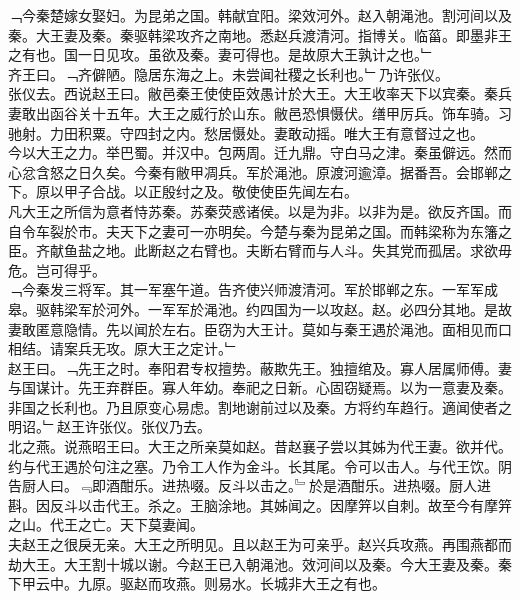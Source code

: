 \documentclass{zhvt-classic}
\begin{document}
\hspace*{2em}﹁今秦楚嫁女娶妇。为昆弟之国。韩献宜阳。梁效河外。赵入朝渑池。割河间以及秦。大王妻及秦。秦驱韩梁攻齐之南地。悉赵兵渡清河。指博关。临菑。即墨非王之有也。国一日见攻。虽欲及秦。妻可得也。是故原大王孰计之也。﹂\\
\hspace*{2em}齐王曰。﹁齐僻陋。隐居东海之上。未尝闻社稷之长利也。﹂乃许张仪。\\
\hspace*{2em}张仪去。西说赵王曰。敝邑秦王使使臣效愚计於大王。大王收率天下以宾秦。秦兵妻敢出函谷关十五年。大王之威行於山东。敝邑恐惧慑伏。缮甲厉兵。饰车骑。习驰射。力田积粟。守四封之内。愁居慑处。妻敢动摇。唯大王有意督过之也。\\
\hspace*{2em}今以大王之力。举巴蜀。并汉中。包两周。迁九鼎。守白马之津。秦虽僻远。然而心忿含怒之日久矣。今秦有敝甲凋兵。军於渑池。原渡河逾漳。据番吾。会邯郸之下。原以甲子合战。以正殷纣之及。敬使使臣先闻左右。\\
\hspace*{2em}凡大王之所信为意者恃苏秦。苏秦荧惑诸侯。以是为非。以非为是。欲反齐国。而自令车裂於市。夫天下之妻可一亦明矣。今楚与秦为昆弟之国。而韩梁称为东籓之臣。齐献鱼盐之地。此断赵之右臂也。夫断右臂而与人斗。失其党而孤居。求欲毋危。岂可得乎。\\
\hspace*{2em}﹁今秦发三将军。其一军塞午道。告齐使兴师渡清河。军於邯郸之东。一军军成皋。驱韩梁军於河外。一军军於渑池。约四国为一以攻赵。赵。必四分其地。是故妻敢匿意隐情。先以闻於左右。臣窃为大王计。莫如与秦王遇於渑池。面相见而口相结。请案兵无攻。原大王之定计。﹂\\
\hspace*{2em}赵王曰。﹁先王之时。奉阳君专权擅势。蔽欺先王。独擅绾及。寡人居属师傅。妻与国谋计。先王弃群臣。寡人年幼。奉祀之日新。心固窃疑焉。以为一意妻及秦。非国之长利也。乃且原变心易虑。割地谢前过以及秦。方将约车趋行。適闻使者之明诏。﹂赵王许张仪。张仪乃去。\\
\hspace*{2em}北之燕。说燕昭王曰。大王之所亲莫如赵。昔赵襄子尝以其姊为代王妻。欲并代。约与代王遇於句注之塞。乃令工人作为金斗。长其尾。令可以击人。与代王饮。阴告厨人曰。﹃即酒酣乐。进热啜。反斗以击之。﹄於是酒酣乐。进热啜。厨人进斟。因反斗以击代王。杀之。王脑涂地。其姊闻之。因摩笄以自刺。故至今有摩笄之山。代王之亡。天下莫妻闻。\\
\hspace*{2em}夫赵王之很戾无亲。大王之所明见。且以赵王为可亲乎。赵兴兵攻燕。再围燕都而劫大王。大王割十城以谢。今赵王已入朝渑池。效河间以及秦。今大王妻及秦。秦下甲云中。九原。驱赵而攻燕。则易水。长城非大王之有也。\\
\end{document}
